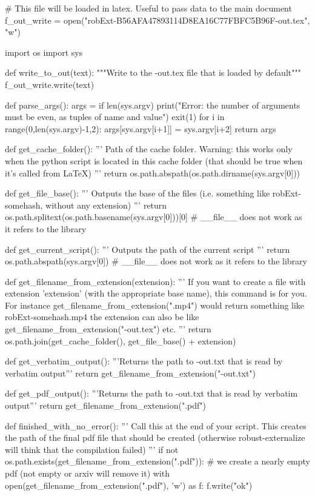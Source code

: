 
# This file will be loaded in latex. Useful to pass data to the main document
f_out_write = open("robExt-B56AFA47893114D8EA16C77FBFC5B96F-out.tex", "w")

import os
import sys

def write_to_out(text):
    """Write to the -out.tex file that is loaded by default"""
    f_out_write.write(text)

def parse_args():
    args = {}
    if len(sys.argv) %
        print("Error: the number of arguments must be even, as tuples of name and value")
        exit(1)
    for i in range(0,len(sys.argv)-1,2):
        args[sys.argv[i+1]] = sys.argv[i+2]
    return args

def get_cache_folder():
    '''
    Path of the cache folder. Warning: this works only when the python script
    is located in this cache folder (that should be true when it's called from LaTeX)
    '''
    return os.path.abspath(os.path.dirname(sys.argv[0]))

def get_file_base():
    '''
    Outputs the base of the files (i.e. something like robExt-somehash, without any extension)
    '''
    return os.path.splitext(os.path.basename(sys.argv[0]))[0] # __file__ does not work as it refers to the library

def get_current_script():
    '''
    Outputs the path of the current script
    '''
    return os.path.abspath(sys.argv[0]) # __file__ does not work as it refers to the library


def get_filename_from_extension(extension):
    '''
    If you want to create a file with extension 'extension' (with the appropriate base name), this command
    is for you. For instance get_filename_from_extension(".mp4") would return something like
    robExt-somehash.mp4
    the extension can also be like get_filename_from_extension("-out.tex") etc.
    '''
    return os.path.join(get_cache_folder(), get_file_base() + extension)

def get_verbatim_output():
    '''Returns the path to -out.txt that is read by verbatim output'''
    return get_filename_from_extension("-out.txt")

def get_pdf_output():
    '''Returns the path to -out.txt that is read by verbatim output'''
    return get_filename_from_extension(".pdf")


def finished_with_no_error():
    '''
    Call this at the end of your script. This creates the path of the final pdf file that should be
    created (otherwise robust-externalize will think that the compilation failed)
    '''
    if not os.path.exists(get_filename_from_extension(".pdf")):
        # we create a nearly empty pdf (not empty or arxiv will remove it)
        with open(get_filename_from_extension(".pdf"), 'w') as f:
            f.write("ok")

